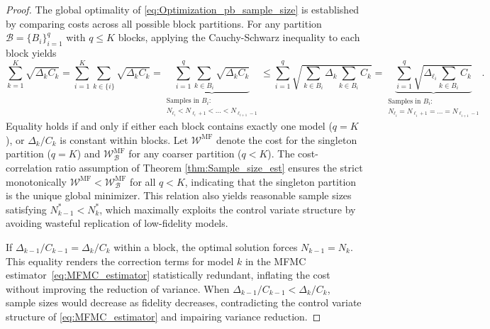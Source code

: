 \begin{proof}
The global optimality of \eqref{eq:Optimization_pb_sample_size} is established by comparing costs across all possible block partitions. For any partition $\mathscr{B} = \{B_i\}_{i=1}^q$ with $q \leq K$ blocks, applying the Cauchy-Schwarz inequality to each block yields
%
\[
\sum_{k=1}^K \sqrt{\Delta_k C_k}  = \sum_{i=1}^K \sum_{k\in \{i\}} \sqrt{\Delta_k C_k} = \underbrace{\sum_{i=1}^q \sum_{k\in B_i} \sqrt{\Delta_k C_k}}_{\substack{\text{Samples in } B_i: \\ N_{\ell_i}<N_{\ell_{i}+1}<\ldots<N_{{\ell_{i+1}-1}}}} \le \sum_{i=1}^q \sqrt{ \sum_{k\in B_i}\Delta_k \sum_{k\in B_i} C_k } = \underbrace{\sum_{i=1}^q \sqrt{ \Delta_{\ell_i} \sum_{k\in B_i} C_k }}_{\substack{\text{Samples in } B_i: \\ N_{\ell_i}=N_{\ell_{i}+1}=\ldots=N_{{\ell_{i+1}-1}}}}.
\]
%
Equality holds if and only if either each block contains exactly one model ($q = K$), or $\Delta_k / C_k$ is constant within blocks. Let $\mathcal{W}^{\mathrm{MF}}$ denote the cost for the singleton partition ($q = K$) and $\mathcal{W}_{\mathscr{B}}^{\mathrm{MF}}$ for any coarser partition ($q < K$). The cost-correlation ratio assumption of Theorem \ref{thm:Sample_size_est} ensures the strict monotonically $\mathcal{W}^{\mathrm{MF}} < \mathcal{W}_{\mathscr{B}}^{\mathrm{MF}}$ for all $q < K$, indicating that the singleton partition is the unique global minimizer. This relation also yields reasonable sample sizes satisfying $N_{k-1}^* < N_k^*$, which maximally exploits the control variate structure by avoiding wasteful replication of low-fidelity models.

If $\Delta_{k-1}/C_{k-1} = \Delta_k/C_k$ within a block, the optimal solution forces $N_{k-1} = N_k$. 
This equality renders the correction terms for model $k$ in the MFMC estimator~\eqref{eq:MFMC_estimator} statistically redundant, inflating the cost without improving the reduction of variance. When $\Delta_{k-1}/C_{k-1} < \Delta_k/C_k$, sample sizes would decrease as fidelity decreases, contradicting the control variate structure of \eqref{eq:MFMC_estimator} and impairing variance reduction.








\end{proof}
